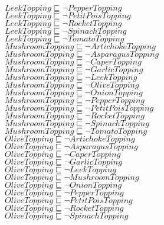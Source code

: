 \documentclass[a4paper,10pt]{article}
\begin{document}
 $LeekTopping \sqsubseteq  \lnot PepperTopping$\\ 
 $LeekTopping \sqsubseteq  \lnot PetitPoisTopping$\\ 
 $LeekTopping \sqsubseteq  \lnot RocketTopping$\\ 
 $LeekTopping \sqsubseteq  \lnot SpinachTopping$\\ 
 $LeekTopping \sqsubseteq  \lnot TomatoTopping$\\ 
 $MushroomTopping \sqsubseteq  \lnot ArtichokeTopping$\\ 
 $MushroomTopping \sqsubseteq  \lnot AsparagusTopping$\\ 
 $MushroomTopping \sqsubseteq  \lnot CaperTopping$\\ 
 $MushroomTopping \sqsubseteq  \lnot GarlicTopping$\\ 
 $MushroomTopping \sqsubseteq  \lnot LeekTopping$\\ 
 $MushroomTopping \sqsubseteq  \lnot OliveTopping$\\ 
 $MushroomTopping \sqsubseteq  \lnot OnionTopping$\\ 
 $MushroomTopping \sqsubseteq  \lnot PepperTopping$\\ 
 $MushroomTopping \sqsubseteq  \lnot PetitPoisTopping$\\ 
 $MushroomTopping \sqsubseteq  \lnot RocketTopping$\\ 
 $MushroomTopping \sqsubseteq  \lnot SpinachTopping$\\ 
 $MushroomTopping \sqsubseteq  \lnot TomatoTopping$\\ 
 $OliveTopping \sqsubseteq  \lnot ArtichokeTopping$\\ 
 $OliveTopping \sqsubseteq  \lnot AsparagusTopping$\\ 
 $OliveTopping \sqsubseteq  \lnot CaperTopping$\\ 
 $OliveTopping \sqsubseteq  \lnot GarlicTopping$\\ 
 $OliveTopping \sqsubseteq  \lnot LeekTopping$\\ 
 $OliveTopping \sqsubseteq  \lnot MushroomTopping$\\ 
 $OliveTopping \sqsubseteq  \lnot OnionTopping$\\ 
 $OliveTopping \sqsubseteq  \lnot PepperTopping$\\ 
 $OliveTopping \sqsubseteq  \lnot PetitPoisTopping$\\ 
 $OliveTopping \sqsubseteq  \lnot RocketTopping$\\ 
 $OliveTopping \sqsubseteq  \lnot SpinachTopping$\\ 
\end{document}

